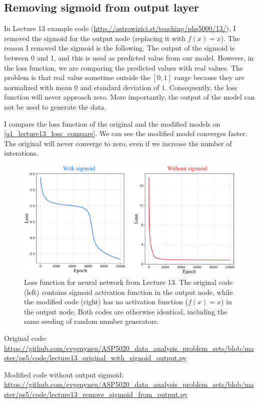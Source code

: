 \subsection*{Removing sigmoid from output layer}

In Lecture 13 example code (\url{http://astrowizici.st/teaching/phs5000/13/}), I removed the sigmoid for the output node (replacing it with $f(x) = x$). The reason I removed the sigmoid is the following. The output of the sigmoid is between 0 and 1, and this is used as predicted value from our model. However, in the loss function, we are comparing the predicted values with real values. The problem is that real value sometime outside the $[0, 1]$ range because they are normalized with mean $0$ and standard deviation of $1$. Consequently, the loss function will never approach zero. More importantly, the output of the model can not be used to generate the data.

I compare the loss function of the original and the modified models on \autoref{q1_lecture13_loss_compare}. We can see the modified model converges faster. The original will never converge to zero, even if we increase the number of interations.

\begin{figure}[!ht]
  \centering
  \includegraphics[width=1\textwidth]{figures/lecture13_loss_compared.pdf}
  \caption{Loss function for neural network from Lecture 13. The original code (left) contains sigmoid activation function in the output node, while the modified code (right) has no activation function ($f(x) = x$) in the output node. Both codes are otherwise identical, including the same seeding of random number generators.}
  \label{q1_lecture13_loss_compare}
\end{figure}

Original code: \\ \url{https://github.com/evgenyneu/ASP5020_data_analysis_problem_sets/blob/master/ps5/code/lecture13_original_with_signoid_output.py}

Modified code without output sigmoid: \\ \url{https://github.com/evgenyneu/ASP5020_data_analysis_problem_sets/blob/master/ps5/code/lecture13_remove_sigmoid_from_output.py}



